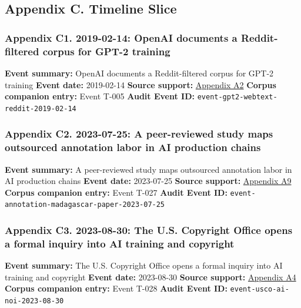 \documentclass[
  american,
  11pt,
  letterpaper,
]{article}
\begin{document}
\subsection{Appendix C. Timeline
Slice}\label{appendix-c.-timeline-slice-4}

\subsubsection{Appendix C1. 2019-02-14: OpenAI documents a
Reddit-filtered corpus for GPT-2
training}\label{ch-04-appendix-c1-2019-02-14-openai-documents-a-reddit-filtered-corpus-for-gpt-2-training}

\textbf{Event summary:} OpenAI documents a Reddit-filtered corpus for
GPT-2 training \textbf{Event date:} 2019-02-14 \textbf{Source support:}
\hyperref[ch-04-appendix-a2-language-models-are-unsupervised-multitask-learners]{Appendix
A2} \textbf{Corpus companion entry:} Event T-005 \textbf{Audit Event
ID:} \texttt{event-gpt2-webtext-reddit-2019-02-14}

\subsubsection{Appendix C2. 2023-07-25: A peer-reviewed study maps
outsourced annotation labor in AI production
chains}\label{ch-04-appendix-c2-2023-07-25-a-peer-reviewed-study-maps-outsourced-annotation-labor-in-ai-production-chains}

\textbf{Event summary:} A peer-reviewed study maps outsourced annotation
labor in AI production chains \textbf{Event date:} 2023-07-25
\textbf{Source support:}
\hyperref[ch-04-appendix-a9-the-problem-with-annotation-human-labour-and-outsourcing-between-france-and-madagascar]{Appendix
A9} \textbf{Corpus companion entry:} Event T-027 \textbf{Audit Event
ID:} \texttt{event-annotation-madagascar-paper-2023-07-25}

\subsubsection{Appendix C3. 2023-08-30: The U.S. Copyright Office opens
a formal inquiry into AI training and
copyright}\label{ch-04-appendix-c3-2023-08-30-the-u-s-copyright-office-opens-a-formal-inquiry-into-ai-training-and-copyright}

\textbf{Event summary:} The U.S. Copyright Office opens a formal inquiry
into AI training and copyright \textbf{Event date:} 2023-08-30
\textbf{Source support:}
\hyperref[ch-04-appendix-a4-copyright-and-artificial-intelligence-notice-of-inquiry]{Appendix
A4} \textbf{Corpus companion entry:} Event T-028 \textbf{Audit Event
ID:} \texttt{event-usco-ai-noi-2023-08-30}
\end{document}
